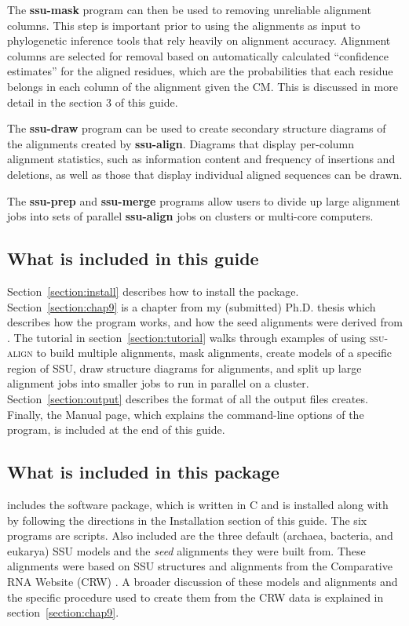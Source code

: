 The \textbf{ssu-mask} program can then be used to removing unreliable
alignment columns. This step is important prior to using the
alignments as input to phylogenetic inference tools that rely heavily
on alignment accuracy.  Alignment columns are selected for removal
based on automatically calculated ``confidence estimates'' for the
aligned residues, which are the probabilities that each residue
belongs in each column of the alignment given the CM. This is
discussed in more detail in the section 3 of this guide.

The \textbf{ssu-draw} program can be used to create secondary
structure diagrams of the alignments created by 
\textbf{ssu-align}. Diagrams that display per-column alignment
statistics, such as information content and frequency of insertions
and deletions, as well as those that display individual aligned
sequences can be drawn.

The \textbf{ssu-prep} and \textbf{ssu-merge} programs allow users to
divide up large alignment jobs into sets of parallel
\textbf{ssu-align} jobs on clusters or multi-core computers.

\subsection{What is included in this guide}

Section~\ref{section:install} describes how to install the
package. Section~\ref{section:chap9} is a chapter from my (submitted)
Ph.D. thesis \cite{Nawrocki09b} which describes how the program works,
and how the seed alignments were derived from 
\cite{CannoneGutell02}.  The tutorial in
section~\ref{section:tutorial} walks through examples of using
\textsc{ssu-align} to build multiple alignments, mask alignments,
create models of a specific region of SSU, draw structure diagrams for
alignments, and split up large alignment jobs into smaller jobs to run
in parallel on a cluster.  Section~\ref{section:output} describes the
format of all the output files  creates. Finally, the
 Manual page, which explains the command-line options of
the program, is included at the end of this guide.

\subsection{What is included in this package}

 includes the  software package, which is
written in C and is installed along with  by following the directions in
the Installation section of this guide. The six 
programs are  scripts. 
Also included are the three default (archaea, bacteria,
and eukarya) SSU models and the \emph{seed} alignments they were built
from. These alignments were based on SSU structures and alignments
from the Comparative RNA Website (CRW) \cite{CannoneGutell02}. A
broader discussion of these models and alignments and the specific
procedure used to create them from the CRW data is explained in
section~\ref{section:chap9}.

